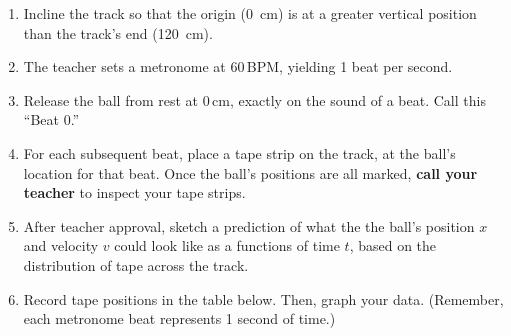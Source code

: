 \documentclass[answers]{exam}
\begin{document}
\begin{enumerate}[itemsep=0pt,topsep=2pt]
\item Incline the track so that the origin (\SI{0}{cm}) is at a greater vertical position than the track's end (\SI{120}{cm}).
\item The teacher sets a metronome at 60\,BPM, yielding 1 beat per second.
\item Release the ball from rest at 0\,cm, exactly on the sound of a beat. Call this ``Beat 0.''
\item For each subsequent beat, place a tape strip on the track, at the ball’s location for that beat. Once the ball's positions are all marked, \textbf{call your teacher} to inspect your tape strips.
\item After teacher approval, sketch a prediction of what the the ball's position $x$ and velocity $v$ could look like as a functions of time $t$, based on the distribution of tape across the track.

\begin{center}
\hspace{1cm}
\end{center}

\item Record tape positions in the table below. Then, graph your data. (Remember, each metronome beat represents 1 second of time.)


\end{enumerate}
\end{document}
